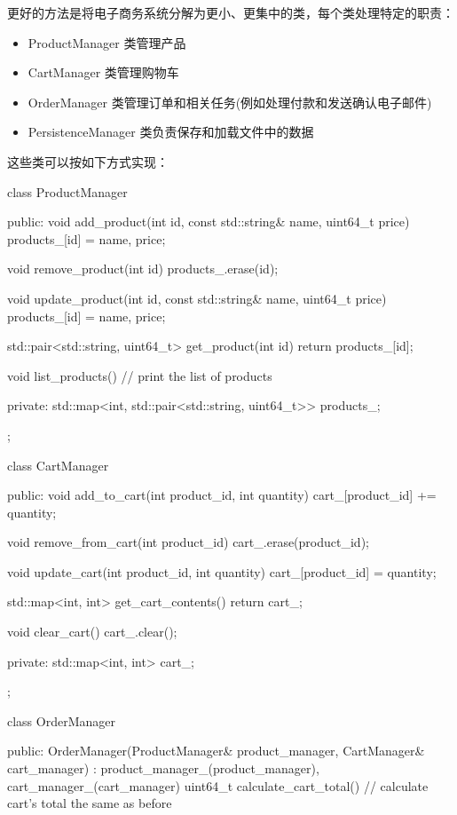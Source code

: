 更好的方法是将电子商务系统分解为更小、更集中的类，每个类处理特定的职责：

\begin{itemize}
\item
ProductManager 类管理产品

\item
CartManager 类管理购物车

\item
OrderManager 类管理订单和相关任务(例如处理付款和发送确认电子邮件)

\item
PersistenceManager 类负责保存和加载文件中的数据
\end{itemize}

这些类可以按如下方式实现：

\begin{cpp}
class ProductManager {
public:
    void add_product(int id, const std::string& name, uint64_t price)
    {
        products_[id] = {name, price};
    }

    void remove_product(int id) {
        products_.erase(id);
    }

    void update_product(int id, const std::string& name, uint64_t price) {
        products_[id] = {name, price};
    }

    std::pair<std::string, uint64_t> get_product(int id) {
        return products_[id];
    }

    void list_products() {
        // print the list of products
    }

private:
    std::map<int, std::pair<std::string, uint64_t>> products_;
};

class CartManager {
public:
    void add_to_cart(int product_id, int quantity) {
        cart_[product_id] += quantity;
    }

    void remove_from_cart(int product_id) {
        cart_.erase(product_id);
    }

    void update_cart(int product_id, int quantity) {
        cart_[product_id] = quantity;
    }

    std::map<int, int> get_cart_contents() {
        return cart_;
    }

    void clear_cart() {
        cart_.clear();
    }

private:
    std::map<int, int> cart_;
};

class OrderManager {
public:
    OrderManager(ProductManager& product_manager, CartManager& cart_manager)
    : product_manager_(product_manager), cart_manager_(cart_manager) {}
        uint64_t calculate_cart_total() {
        // calculate cart's total the same as before
    }

}
\end{cpp}
